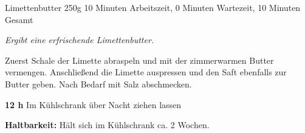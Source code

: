 \begin{recipe}{Limettenbutter} {250g} {10 Minuten Arbeitszeit, 0 Minuten Wartezeit, 10 Minuten Gesamt}

  \freeform{}\textit{Ergibt eine erfrischende Limettenbutter.}


  Zuerst Schale der Limette abraspeln und mit der zimmerwarmen Butter vermengen.
  Anschließend die Limette auspressen und den Saft ebenfalls zur Butter geben.
  Nach Bedarf mit Salz abschmecken.

  \newstep{}\textbf{12 h}
  Im Kühlschrank über Nacht ziehen lassen

  \freeform{}\hrulefill{}

  \freeform{}\textbf{Haltbarkeit:}
  Hält sich im Kühlschrank ca. 2 Wochen.

\end{recipe}
